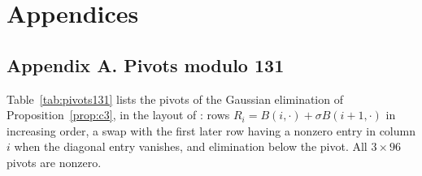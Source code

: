 \documentclass[11pt]{article}
\theoremstyle{definition}
\begin{document}
\clearpage
\section*{Appendices}

\subsection*{Appendix A. Pivots modulo 131}

Table~\ref{tab:pivots131} lists the pivots of the Gaussian elimination of Proposition~\ref{prop:c3}, in the layout of \cite[Table~1]{OAI}: rows $R_i=B(i,\cdot)+\sigma B(i+1,\cdot)$ in increasing order, a swap with the first later row having a nonzero entry in column $i$ when the diagonal entry vanishes, and elimination below the pivot. All $3\times96$ pivots are nonzero.
\end{document}

